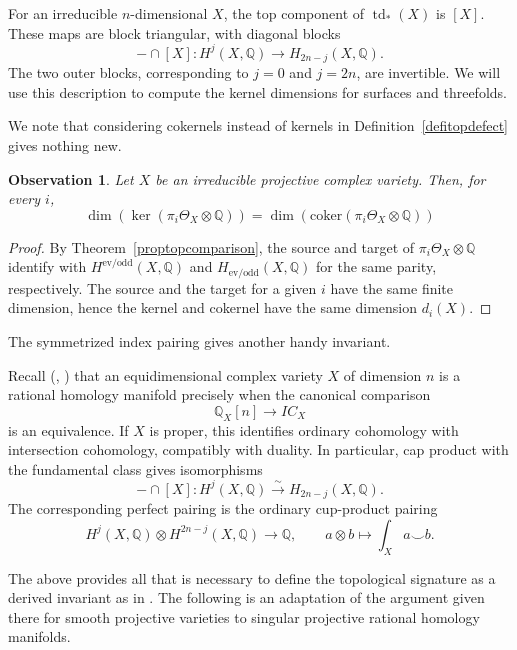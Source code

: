 \documentclass{amsart}
\theoremstyle{plain}
\newtheorem{obs}[prop]{Observation}
\theoremstyle{definition}
\newcommand{\bbQ}{\mathbb{Q}}
\newcommand{\coker}{\mathrm{coker}}
\DeclareMathOperator{\td}{td}
\begin{document}
For an irreducible $n$-dimensional $X$, the top component of
$\td_*(X)$ is $[X]$.
These maps are block triangular, with diagonal blocks
\begin{equation}\label{capblocks}
-\cap[X]:H^j(X,\bbQ)\longrightarrow H_{2n-j}(X,\bbQ).
\end{equation}
The two outer blocks, corresponding to $j=0$ and $j=2n$, are invertible. We will use this description to compute the kernel dimensions for surfaces and threefolds.

We note that considering cokernels instead of kernels in Definition~\ref{defitopdefect} gives nothing new.

\begin{obs}\label{kercoker}
Let $X$ be an irreducible projective complex variety. Then, for every $i$,
\[
\dim(\ker(\pi_i\Theta_X\otimes\bbQ))=\dim(\coker(\pi_i\Theta_X\otimes\bbQ))
\]
\end{obs}

\begin{proof}
By Theorem~\ref{proptopcomparison}, the source and target of $\pi_{i}\Theta_X\otimes\bbQ$ identify with $H^{\mathrm{ev/odd}}(X,\bbQ)$ and $H_{\mathrm{ev/odd}}(X,\bbQ)$ for the same parity, respectively. The source and the target for a given $i$ have the same finite dimension, hence the kernel and cokernel have the same dimension
$d_i(X)$.    
\end{proof}

\medskip

The symmetrized index pairing gives another handy invariant. 

Recall (\cite{BM83}, \cite[Section~3]{PP25a}) that an equidimensional complex variety $X$ of dimension $n$ is a rational homology manifold precisely when the canonical comparison
\[
\bbQ_X[n]\longrightarrow IC_X
\]
is an equivalence.
If $X$ is proper, this identifies ordinary cohomology with intersection cohomology, compatibly with duality.
In particular, cap product with the fundamental class gives isomorphisms
\[
-\cap[X]:H^j(X,\bbQ)\xrightarrow{\sim}H_{2n-j}(X,\bbQ).
\]
The corresponding perfect pairing is the ordinary cup-product pairing
\[
H^j(X,\bbQ)\otimes H^{2n-j}(X,\bbQ)
\longrightarrow\bbQ,
\qquad
a\otimes b\longmapsto\int_X a\smile b.
\]

The above provides all that is necessary to define the topological signature as a derived invariant as in \cite{Ant26}. 
The following is an adaptation of the argument given there for smooth projective varieties to singular projective rational homology manifolds.
\end{document}
